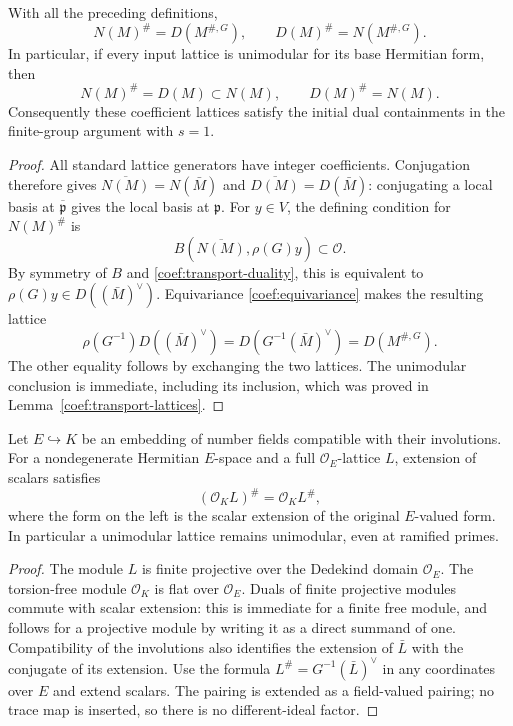 \begin{theorem}\label{coef:hermitian-duality}
With all the preceding definitions,
\begin{equation}\label{coef:hermitian-duality-eq}
             N(M)^\#=D(M^{\#,G}),\qquad
             D(M)^\#=N(M^{\#,G}).
\end{equation}
In particular, if every input lattice is unimodular for its base
Hermitian form, then
\begin{equation}\label{coef:unimodular}
                         N(M)^\#=D(M)\subset N(M),\qquad
                         D(M)^\#=N(M).
\end{equation}
Consequently these coefficient lattices satisfy the initial dual
containments in the finite-group argument with $s=1$.
\end{theorem}
\begin{proof}
All standard lattice generators have integer coefficients. Conjugation
therefore gives $\overline{N(M)}=N(\bar M)$ and
$\overline{D(M)}=D(\bar M)$: conjugating a local basis at
$\overline{\mathfrak p}$ gives the local basis at $\mathfrak p$.
For $y\in V$, the defining condition for $N(M)^\#$ is
\[
 B(\overline{N(M)},\rho(G)y)\subset\mathcal O.
\]
By symmetry of $B$ and \eqref{coef:transport-duality}, this is
equivalent to $\rho(G)y\in D((\bar M)^\vee)$.
Equivariance \eqref{coef:equivariance} makes the resulting lattice
\[
 \rho(G^{-1})D((\bar M)^\vee)
                   =D(G^{-1}(\bar M)^\vee)=D(M^{\#,G}).
\]
The other equality follows by exchanging the two lattices.
The unimodular conclusion is immediate, including its inclusion,
which was proved in Lemma~\ref{coef:transport-lattices}.
\end{proof}

\begin{lemma}\label{coef:extension}
Let $E\hookrightarrow K$ be an embedding of number fields compatible
with their involutions. For a nondegenerate Hermitian $E$-space and a full
$\mathcal O_E$-lattice $L$, extension of scalars satisfies
\[
 (\mathcal O_K L)^\#=\mathcal O_K L^\#,
\]
where the form on the left is the scalar extension of the original
$E$-valued form. In particular a unimodular lattice remains unimodular,
even at ramified primes.
\end{lemma}
\begin{proof}
The module $L$ is finite projective over the Dedekind domain
$\mathcal O_E$. The torsion-free module $\mathcal O_K$ is flat over
$\mathcal O_E$. Duals of finite projective modules commute with scalar
extension: this is immediate for a finite free module, and follows
for a projective module by writing it as a direct summand of one.
Compatibility of the involutions also identifies the extension of
$\bar L$ with the conjugate of its extension. Use the formula
$L^\#=G^{-1}(\bar L)^\vee$ in any coordinates over $E$ and extend
scalars. The pairing is extended as a field-valued pairing; no trace
map is inserted, so there is no different-ideal factor.
\end{proof}

